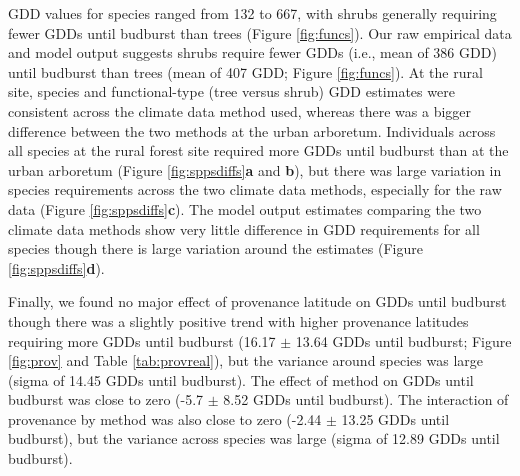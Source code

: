 \documentclass{article}\usepackage[]{graphicx}\usepackage[]{color}
\begin{document}
GDD values for species ranged from 132 to 667, with shrubs generally requiring fewer GDDs until budburst than trees (Figure \ref{fig:funcs}). Our raw empirical data and model output suggests shrubs require fewer GDDs (i.e., mean of 386 GDD) until budburst than trees (mean of 407 GDD; Figure \ref{fig:funcs}). At the rural site, species and functional-type (tree versus shrub) GDD estimates were consistent across the climate data method used, whereas there was a bigger difference between the two methods at the urban arboretum. Individuals across all species at the rural forest site required more GDDs until budburst than at the urban arboretum (Figure \ref{fig:sppsdiffs}\textbf{a} and \textbf{b}), but there was large variation in species requirements across the two climate data methods, especially for the raw data (Figure \ref{fig:sppsdiffs}\textbf{c}). The model output estimates comparing the two climate data methods show very little difference in GDD requirements for all species though there is large variation around the estimates (Figure \ref{fig:sppsdiffs}\textbf{d}). 

Finally, we found no major effect of provenance latitude on GDDs until budburst though there was a slightly positive trend with higher provenance latitudes requiring more GDDs until budburst (16.17 $\pm$ 13.64 GDDs until budburst; Figure \ref{fig:prov} and Table \ref{tab:provreal}), but the variance around species was large (sigma of 14.45 GDDs until budburst). The effect of method on GDDs until budburst was close to zero (-5.7 $\pm$ 8.52 GDDs until budburst). The interaction of provenance by method was also close to zero (-2.44 $\pm$ 13.25 GDDs until budburst), but the variance across species was large (sigma of 12.89 GDDs until budburst).
\end{document}
